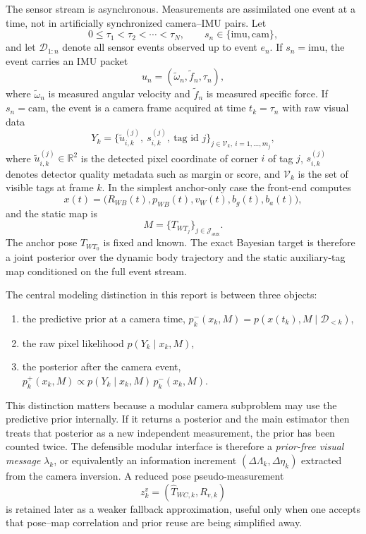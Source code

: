 \documentclass[11pt]{report}
\newcommand{\R}{\mathbb{R}}
\begin{document}
The sensor stream is asynchronous. Measurements are assimilated one event at a time, not in artificially synchronized camera--IMU pairs. Let
\begin{equation}
0\le \tau_1 < \tau_2 < \cdots < \tau_N,
\qquad
s_n\in\{\mathrm{imu},\mathrm{cam}\},
\end{equation}
and let $\mathcal D_{1:n}$ denote all sensor events observed up to event $e_n$. If $s_n=\mathrm{imu}$, the event carries an IMU packet
\begin{equation}
u_n=(\widetilde\omega_n,\widetilde f_n,\tau_n),
\end{equation}
where $\widetilde\omega_n$ is measured angular velocity and $\widetilde f_n$ is measured specific force. If $s_n=\mathrm{cam}$, the event is a camera frame acquired at time $t_k=\tau_n$ with raw visual data
\begin{equation}
Y_k=\{\widetilde u_{i,k}^{(j)},\ s_{i,k}^{(j)},\ \text{tag id }j\}_{j\in\mathcal V_k,\ i=1,\dots,m_j},
\end{equation}
where $\widetilde u_{i,k}^{(j)}\in\R^2$ is the detected pixel coordinate of corner $i$ of tag $j$, $s_{i,k}^{(j)}$ denotes detector quality metadata such as margin or score, and $\mathcal V_k$ is the set of visible tags at frame $k$. In the simplest anchor-only case the front-end computes
\[
x(t)=\big(R_{WB}(t),p_{WB}(t),v_W(t),b_g(t),b_a(t)\big),
\]
and the static map is
\[
M=\{T_{WT_j}\}_{j\in\mathcal J_{\mathrm{aux}}}.
\]
The anchor pose $T_{WT_0}$ is fixed and known. The exact Bayesian target is therefore a joint posterior over the dynamic body trajectory and the static auxiliary-tag map conditioned on the full event stream.

The central modeling distinction in this report is between three objects:
\begin{enumerate}
  \item the predictive prior at a camera time, $p^-_k(x_k,M)=p(x(t_k),M\mid \mathcal D_{<k})$,
  \item the raw pixel likelihood $p(Y_k\mid x_k,M)$,
  \item the posterior after the camera event, $p^+_k(x_k,M)\propto p(Y_k\mid x_k,M)\,p^-_k(x_k,M)$.
\end{enumerate}
This distinction matters because a modular camera subproblem may use the predictive prior internally. If it returns a posterior and the main estimator then treats that posterior as a new independent measurement, the prior has been counted twice. The defensible modular interface is therefore a \emph{prior-free visual message} $\lambda_k$, or equivalently an information increment $(\Delta\Lambda_k,\Delta\eta_k)$ extracted from the camera inversion. A reduced pose pseudo-measurement
\begin{equation}
\label{eq:reduced_pose_summary_interface}
z_k^v=(\widehat T_{WC,k},R_{v,k})
\end{equation}
is retained later as a weaker fallback approximation, useful only when one accepts that pose--map correlation and prior reuse are being simplified away.
\end{document}
